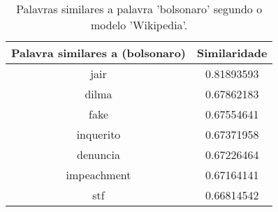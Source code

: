 \begin{table}[H]
\centering
\begin{tabular}{|c | c|}
 \hline
 Palavra similares a (bolsonaro) & Similaridade \\ [0.5ex]
 \hline
 jair & 0.81893593 \\
 \hline
 dilma & 0.67862183 \\
 \hline
 fake & 0.67554641 \\
 \hline
 inquerito & 0.67371958 \\
 \hline
 denuncia & 0.67226464 \\
 \hline
 impeachment & 0.67164141 \\
 \hline
 stf & 0.66814542 \\
 \hline
\end{tabular}
\caption{Palavras similares a palavra 'bolsonaro' segundo o modelo 'Wikipedia'.}
\label{table:1}
\end{table}

